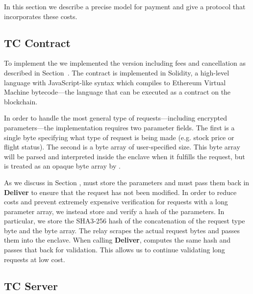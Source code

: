 In this section we describe a precise model for payment and give a protocol that incorporates these costs.







\subsection{TC Contract}

To implement the \tcont we implemented the version including fees and cancellation as described in Section~.
The contract is implemented in Solidity, a high-level language with JavaScript-like syntax which compiles to Ethereum Virtual Machine bytecode---the language that can be executed as a contract on the blockchain.

In order to handle the most general type of requests---including encrypted parameters---the \tcont implementation requires two parameter fields.
The first is a single byte specifying what type of request is being made (e.g. stock price or flight status).
The second is a byte array of user-specified size.
This byte array will be parsed and interpreted inside the enclave when it fulfills the request, but is treated as an opaque byte array by \tcont.

As we discuss in Section , \tcont must store the parameters and \tc must pass them back in {\bf Deliver} to ensure that the request has not been modified.
In order to reduce costs and prevent extremely expensive verification for requests with a long parameter array, we instead store and verify a hash of the parameters.
In particular, we store the SHA3-256 hash of the concatenation of the request type byte and the byte array.
The relay scrapes the actual request bytes and passes them into the enclave.
When calling {\bf Deliver}, \enclaveprog computes the same hash and passes that back for validation.
This allows us to continue validating long requests at low cost.



\subsection{TC Server}


